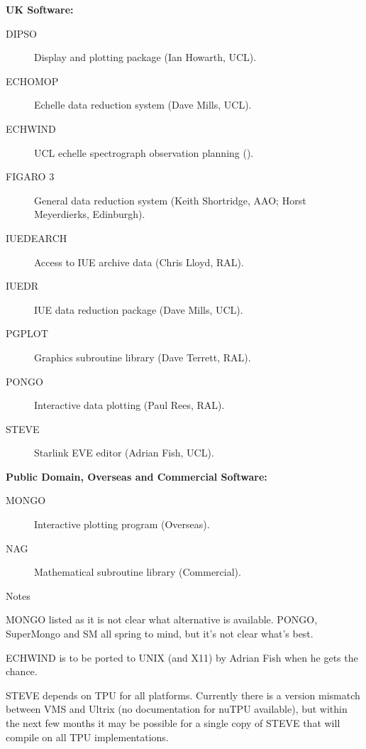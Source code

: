 \begin{center}
{\bf UK Software:}
\end{center}

\begin{description}
\item[DIPSO] Display and plotting package (Ian Howarth, UCL).
\item[ECHOMOP] Echelle data reduction system (Dave Mills, UCL).
\item[ECHWIND] UCL echelle spectrograph observation planning ().
\item[FIGARO 3] General data reduction system (Keith Shortridge, AAO; Horst
Meyerdierks, Edinburgh).
\item[IUEDEARCH] Access to IUE archive data (Chris Lloyd, RAL).
\item[IUEDR] IUE data reduction package (Dave Mills, UCL).
\item[PGPLOT] Graphics subroutine library (Dave Terrett, RAL).
\item[PONGO] Interactive data plotting (Paul Rees, RAL).
\item[STEVE] Starlink EVE editor (Adrian Fish, UCL).
\end{description}


\vspace{5mm}
\begin{center}
{\bf Public Domain, Overseas and Commercial Software:}
\end{center}

\begin{description}
\item[MONGO] Interactive plotting program (Overseas).
\item[NAG] Mathematical subroutine library (Commercial).
\end{description}


\vspace{5mm}
\begin{center}
{\large\sc Notes}
\end{center}

MONGO listed as it is not clear what alternative is available.
PONGO, SuperMongo and SM all spring to mind, but it's not clear what's best.

ECHWIND is to be ported to UNIX (and X11) by Adrian Fish when he gets the
chance.

STEVE depends on TPU for all platforms. 
Currently there is a version mismatch between VMS and Ultrix (no documentation 
for nuTPU available), but within the next few months it may be possible for a 
single copy of STEVE that will compile on all TPU implementations.


